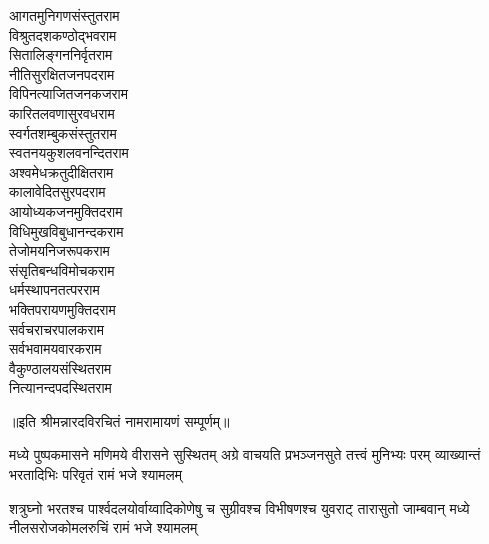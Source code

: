 \begin{large}
\begin{multicols}{2}
आगतमुनिगणसंस्तुत\hfill राम\\
विश्रुतदशकण्ठोद्भव\hfill राम\\
सितालिङ्गननिर्वृत\hfill राम\\
नीतिसुरक्षितजनपद\hfill राम\\
विपिनत्याजितजनकज\hfill राम\\
कारितलवणासुरवध\hfill राम\\
स्वर्गतशम्बुकसंस्तुत\hfill राम\\
स्वतनयकुशलवनन्दित\hfill राम\\
अश्वमेधक्रतुदीक्षित\hfill राम\\
कालावेदितसुरपद\hfill राम\\
आयोध्यकजनमुक्तिद\hfill राम\\
विधिमुखविबुधानन्दक\hfill राम\\
तेजोमयनिजरूपक\hfill राम\\
संसृतिबन्धविमोचक\hfill राम\\
धर्मस्थापनतत्पर\hfill राम\\
भक्तिपरायणमुक्तिद\hfill राम\\
सर्वचराचरपालक\hfill राम\\
सर्वभवामयवारक\hfill राम\\
वैकुण्ठालयसंस्थित\hfill राम\\
नित्यानन्दपदस्थित\hfill राम\\
\jaya
\end{multicols}
\vspace{-0.5cm}
॥इति श्रीमन्नारदविरचितं नामरामायणं सम्पूर्णम्॥
\end{large}

\closesection

{मध्ये पुष्पकमासने मणिमये वीरासने सुस्थितम्}
{अग्रे वाचयति प्रभञ्जनसुते तत्त्वं मुनिभ्यः परम्}
{व्याख्यान्तं भरतादिभिः परिवृतं रामं भजे श्यामलम्}

{शत्रुघ्नो भरतश्च पार्श्वदलयोर्वाय्वादिकोणेषु च}
{सुग्रीवश्च विभीषणश्च युवराट् तारासुतो जाम्बवान्}
{मध्ये नीलसरोजकोमलरुचिं रामं भजे श्यामलम्}
